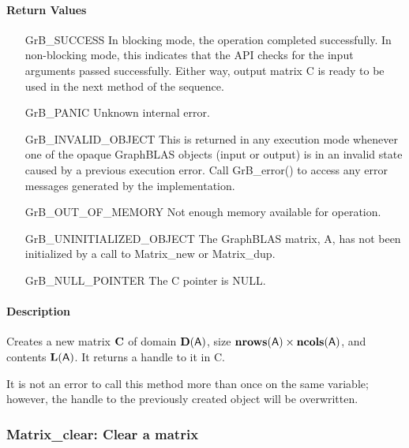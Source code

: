 \paragraph{Return Values}

\begin{itemize}[leftmargin=2.1in]
    \item[{\sf GrB\_SUCCESS}]         In blocking mode, the operation completed
    successfully. In non-blocking mode, this indicates that the API checks 
    for the input arguments passed successfully. Either way, output matrix 
    {\sf C} is ready to be used in the next method of the sequence.

    \item[{\sf GrB\_PANIC}]           Unknown internal error.
    
    \item[{\sf GrB\_INVALID\_OBJECT}] This is returned in any execution mode 
    whenever one of the opaque GraphBLAS objects (input or output) is in an invalid 
    state caused by a previous execution error.  Call {\sf GrB\_error()} to access 
    any error messages generated by the implementation.

    \item[{\sf GrB\_OUT\_OF\_MEMORY}] Not enough memory available for operation.
    
    \item[{\sf GrB\_UNINITIALIZED\_OBJECT}]  The GraphBLAS matrix, {\sf A}, has 
    not been initialized by a call to {\sf Matrix\_new} or {\sf Matrix\_dup}.
    
    \item[{\sf GrB\_NULL\_POINTER}]   The {\sf C} pointer is {\sf NULL}.
\end{itemize}

\paragraph{Description}

Creates a new matrix ${\bf C}$ of domain $\mathbf{D}({\sf A})$, size 
$\mathbf{nrows}({\sf A}) \times \mathbf{ncols}({\sf A})$, and contents 
$\mathbf{L}({\sf A})$. It returns a handle to it in {\sf C}.

It is not an error to call this method more than once on the same variable;  
however, the handle to the previously created object will be overwritten. 

\subsubsection{{\sf Matrix\_clear}: Clear a matrix}

